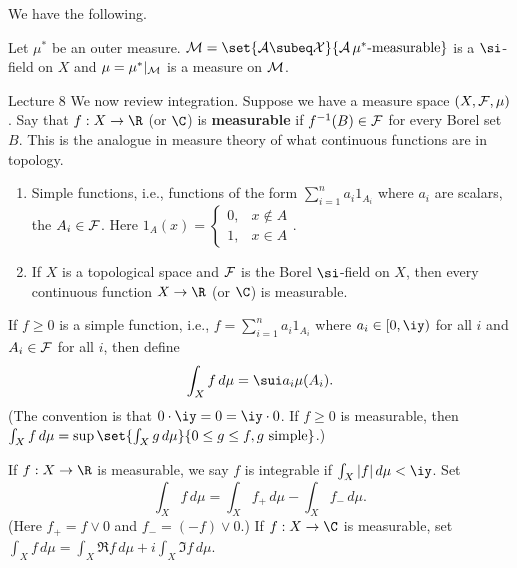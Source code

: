 We have the following.
\begin{pr}
Let $\mu^*$ be an outer measure. $\cal M=\set{A\subeq X}{A\,\mu^*\text{-measurable}}$ is a $\si$-field on $X$ and $\mu=\mu^*|_{\cal M}$ is a measure on $\cal M$.\end{pr}

{\color{blue}Lecture 8}
We now review integration. Suppose we have a measure space $(X,\cal F, \mu)$. Say that $f:X\to \R$ (or $\C$) is \textbf{measurable} if $f^{-1}(B)\in \cal F$ for every Borel set $B$. This is the analogue in measure theory of what continuous functions are in topology. 
\begin{ex}
\begin{enumerate}
\item
Simple functions, i.e., functions of the form $\sum_{i=1}^n a_i1_{A_i}$ where $a_i$ are scalars, the $A_i\in \cal F$. Here $1_A(x)=\begin{cases}0,&x\nin A\\1,&x\in A\end{cases}$.
\item
If $X$ is a topological space and $\cal F$ is the Borel $\si$-field on $X$, then every continuous function $X\to \R$ (or $\C$) is measurable. 
\end{enumerate}
\end{ex}
If $f\ge0$ is a simple function, i.e., $f=\sum_{i=1}^n a_i1_{A_i}$ where $a_i\in [0,\iy)$ for all $i$ and $A_i\in \cal F$ for all $i$, then define
\[
\int_X f\,d\mu=\sui a_i\mu(A_i).
\]
(The convention is that $0\cdot \iy=0=\iy\cdot 0$. If $f\ge 0$ is measurable, then $\int_Xf\,d\mu=\sup\set{\int_X g\,d\mu}{0\le g\le f,g\text{ simple}}$.)

If $f:X\to \R$ is measurable, we say $f$ is integrable if $\int_X|f|\,d\mu<\iy$. Set
\[
\int_X f\,d\mu = \int_Xf_+\,d\mu-\int_X f_-\,d\mu.
\]
(Here $f_+=f\vee 0$ and $f_-=(-f)\vee 0$.) If $f:X\to \C$ is measurable, set $\int_X f\,d\mu=\int_X\Re f\,d\mu +i\int_X \Im f\,d\mu$.


